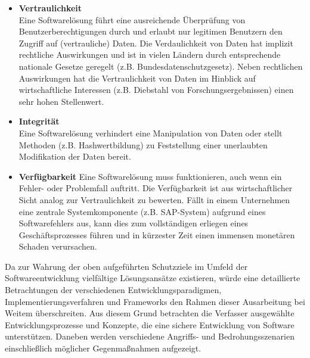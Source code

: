 \begin{itemize}
      \item\textbf{Vertraulichkeit}\\
 	   Eine Softwarelösung führt eine ausreichende Überprüfung von 
 	   Benutzerberechtigungen durch und erlaubt nur legitimen Benutzern 
 	   den Zugriff auf (vertrauliche) Daten. 
 	   Die Verdaulichkeit von Daten hat implizit rechtliche Auswirkungen 
 	   und ist in vielen Ländern durch entsprechende nationale Gesetze 
 	   geregelt (z.B. Bundesdatenschutzgesetz). Neben rechtlichen 
 	   Auswirkungen hat die Vertraulichkeit von Daten im Hinblick auf 
 	   wirtschaftliche Interessen (z.B. Diebstahl von Forschungsergebnissen) 
 	   einen sehr hohen Stellenwert.
	  
	  \item\textbf{Integrität}\\
	   Eine Softwarelösung verhindert eine Manipulation von Daten oder 
	   stellt Methoden (z.B. Hashwertbildung) zu Feststellung einer 
	   unerlaubten Modifikation der Daten bereit.
	  
	  \item\textbf{Verfügbarkeit} 
	   Eine Softwarelösung muss funktionieren, auch wenn ein Fehler- 
	   oder Problemfall auftritt. Die Verfügbarkeit ist aus wirtschaftlicher 
	   Sicht analog zur Vertraulichkeit zu bewerten. Fällt in einem 
	   Unternehmen eine zentrale Systemkomponente (z.B. SAP-System) 
	   aufgrund eines Softwarefehlers aus, kann dies zum vollständigen 
	   erliegen eines Geschäftsprozesses führen und in kürzester Zeit 
	   einen immensen monetären Schaden verursachen.
\end{itemize}

Da zur Wahrung der oben aufgeführten Schutzziele im Umfeld der 
Softwareentwicklung vielfältige Lösungsansätze existieren, würde eine 
detaillierte Betrachtungen der verschiedenen Entwicklungsparadigmen, 
Implementierungsverfahren und Frameworks den Rahmen dieser Ausarbeitung 
bei Weitem überschreiten. Aus diesem Grund betrachten die Verfasser 
ausgewählte Entwicklungsprozesse und Konzepte, die eine sichere 
Entwicklung von Software unterstützen. Daneben werden verschiedene 
Angriffs- und Bedrohungsszenarien einschließlich möglicher 
Gegenmaßnahmen aufgezeigt.


